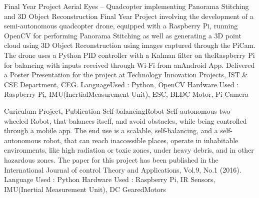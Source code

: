 

\begin{cventries}

  \cventry
    {Final Year Project} %
    {Aerial Eyes – Quadcopter implementing Panorama Stitching and 3D Object Reconstruction} %
    {} %
    {} %
    {
      \newline
      Final Year Project involving the development of a semi-autonomous quadcopter drone, equipped with a Raspberry Pi, running OpenCV for performing Panorama Stitching as well as generating a 3D point cloud using 3D Object Reconstruction using images captured through the PiCam. The drone uses a Python PID controller with​ a Kalman​ filter​ on​ the​ Raspberry​ Pi​ for​ balancing​ with​ inputs​ received​ through​ Wi-Fi​ from​ an​ Android​ App. 
      Delivered a Poster Presentation for the project at Technology Innovation Projects, IST \& CSE Department, CEG.
      Language​ Used​ : Python,​ OpenCV
      Hardware​ Used​ : Raspberry​ Pi,​ IMU(Inertial​ Measurement​ Unit),​ ESC,​ BLDC​ Motor,​ Pi​ Camera
    }

  \cventry
    {Curiculum Project, Publication} %
    {Self-balancing​ Robot} %
    {} %
    {} %
    {
      \newline
      Self-autonomous two wheeled Robot, that balances itself, and avoid obstacles, while being controlled through a mobile app. The end use is a scalable, self-balancing, and a self-autonomous robot, that can reach inaccessible places, operate in inhabitable environments, like high radiation or toxic zones, under heavy debris, and in other hazardous​ zones.
      The paper for this project has been published in the International Journal of control Theory and Applications, Vol.9, No.1 (2016).
      Language​ Used​ : Python
      Hardware​ Used​ : Raspberry​ Pi,​ IR​ Sensors,​ IMU(Inertial​ Measurement​ Unit),​ DC​ Geared​ Motors
    }


\end{cventries}
